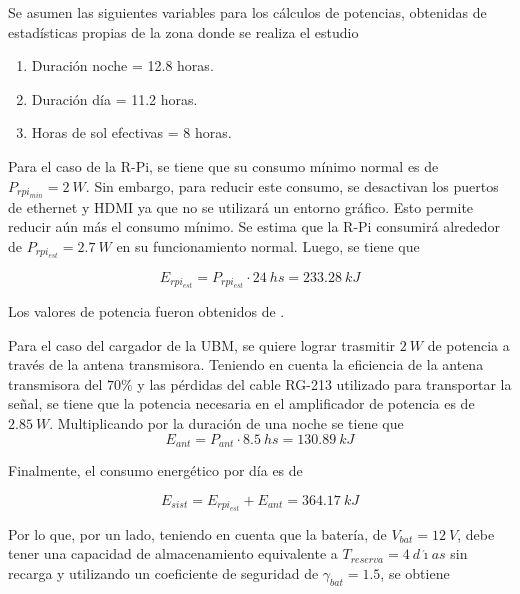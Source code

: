 
Se asumen las siguientes variables para los cálculos de potencias, obtenidas de estadísticas propias de la zona donde se realiza el estudio \cite{ref:weather_bariloche}
\begin{enumerate}
	\item Duración noche = 12.8 horas.
	\item Duración día = 11.2 horas.
	\item Horas de sol efectivas = 8 horas.
\end{enumerate}

Para el caso de la R-Pi, se tiene que su consumo mínimo normal es de $P_{rpi_{min}} = 2 \ W$. Sin embargo, para reducir este consumo, se desactivan los puertos de ethernet y HDMI ya que no se utilizará un entorno gráfico. Esto permite reducir aún más el consumo mínimo. Se estima  que la R-Pi consumirá alrededor de $P_{rpi_{est}} = 2.7 \ W$ en su funcionamiento normal.
Luego, se tiene que

\begin{equation}
E_{rpi_{est}} = P_{rpi_{est}}\cdot 24 \ hs = 233.28 \ kJ
\end{equation}

Los valores de potencia fueron obtenidos de .

Para el caso del cargador de la UBM, se quiere lograr trasmitir $2 \ W$ de potencia a través de la antena transmisora. Teniendo en cuenta la eficiencia de la antena transmisora del $70\%$ \tbc y las pérdidas del cable RG-213 utilizado para transportar la señal, se tiene que la potencia necesaria en el amplificador de potencia es de $2.85 \ W$. Multiplicando por la duración de una noche se tiene que
\begin{equation}
E_{ant} = P_{ant}\cdot 8.5 \ hs = 130.89 \ kJ
\end{equation}

Finalmente, el consumo energético por día es de

\begin{equation}
E_{sist} = E_{rpi_{est}} + E_{ant} = 364.17 \ kJ
\end{equation}

Por lo que, por un lado, teniendo en cuenta que la batería, de $V_{bat} = 12 \ V$, debe tener una capacidad de almacenamiento equivalente a $T_{reserva} = 4 \ d\acute{\imath}as$ sin recarga  y utilizando un coeficiente de seguridad de $\gamma_{bat} = 1.5$, se obtiene

